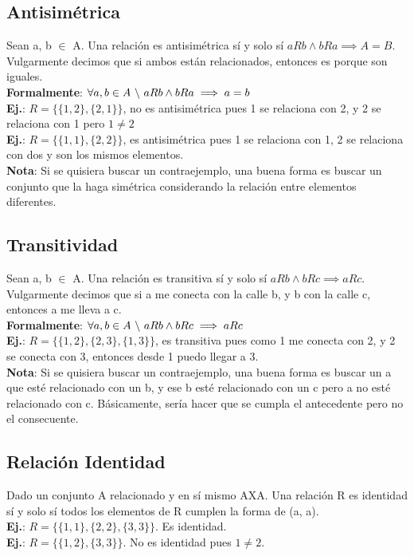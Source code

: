 \documentclass[10pt,a4paper]{article}
\begin{document}
\subsection*{Antisimétrica}
Sean a, b $\in$ A. Una relación es antisimétrica sí y solo sí $aRb \land bRa \implies A = B$. Vulgarmente decimos que si ambos están relacionados, entonces es porque son iguales. \\
\textbf{Formalmente}: $ \forall a, b \in A \ \symbol{92} \ aRb \land bRa \implies a=b$ \\
\textbf{Ej.}: $R = \{\{1, 2\}, \{2, 1\}\}$, no es antisimétrica pues 1 se relaciona con 2, y 2 se relaciona con 1 pero $1 \neq 2$ \\
\textbf{Ej.}: $R = \{\{1, 1\}, \{2, 2\}\}$, es antisimétrica pues 1 se relaciona con 1, 2 se relaciona con dos y son los mismos elementos. \\

\textbf{Nota}: Si se quisiera buscar un contraejemplo, una buena forma es buscar un conjunto que la haga simétrica considerando la relación entre elementos diferentes.
\subsection*{Transitividad}
Sean a, b $\in$ A. Una relación es transitiva sí y solo sí $aRb \land bRc \implies aRc$. Vulgarmente decimos que si a me conecta con la calle b, y b con la calle c, entonces a me lleva a c. \\
\textbf{Formalmente}: $ \forall a, b \in A \ \symbol{92} \ aRb \land bRc \implies aRc$ \\
\textbf{Ej.}: $R = \{\{1, 2\}, \{2, 3\}, \{1, 3\} \}$, es transitiva pues como 1 me conecta con 2, y 2 se conecta con 3, entonces desde 1 puedo llegar a 3. \\
\textbf{Nota}: Si se quisiera buscar un contraejemplo, una buena forma es buscar un a que esté relacionado con un b, y ese b esté relacionado con un c pero a no esté relacionado con c. Básicamente, sería hacer que se cumpla el antecedente pero no el consecuente.
\subsection*{Relación Identidad}
Dado un conjunto A relacionado y en sí mismo AXA. Una relación R es identidad sí y solo sí todos los elementos de R cumplen la forma de (a, a). \\
\textbf{Ej.}: $R = \{\{1, 1\}, \{2, 2\}, \{3, 3\} \}$. Es identidad. \\
\textbf{Ej.}: $R = \{\{1, 2\}, \{3, 3\} \}$. No es identidad pues $1 \neq 2$.
\end{document}
